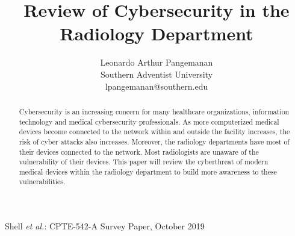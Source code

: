 \documentclass[pdf,bookmarks,colorlinks=true]{IEEEtran}
\begin{document}
%
\title{Review of Cybersecurity in the Radiology Department}


\author{Leonardo Arthur Pangemanan\\
	Southern Adventist University\\
	lpangemanan@southern.edu
}



%
{Shell \MakeLowercase{\textit{et al.}}: CPTE-542-A Survey Paper, October 2019}

\maketitle

\begin{abstract}
	Cybersecurity is an increasing concern for many healthcare organizations, information technology and medical cybersecurity professionals. As more computerized medical devices become connected to the network within and outside the facility increases, the risk of cyber attacks also increases. Moreover, the radiology departments have most of their devices connected to the network. Most radiologists are unaware of the vulnerability of their devices. This paper will review the cyberthreat of modern medical devices within the radiology department to build more awareness to these vulnerabilities.
\end{abstract}
\end{document}
